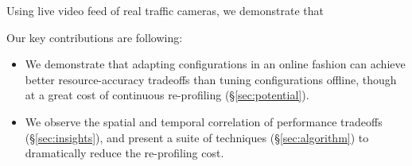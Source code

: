 {Using live video feed of \fillme real traffic cameras, we demonstrate
that 

Our key contributions are following:
\begin{itemize}
    \item We demonstrate that adapting \nn configurations in an online 
    fashion can achieve better resource-accuracy tradeoffs than 
    tuning configurations offline, though at a great cost of continuous 
    re-profiling (\S\ref{sec:potential}).
    \item We observe the spatial and temporal correlation of performance 
    tradeoffs (\S\ref{sec:insights}), and present a suite of techniques 
    (\S\ref{sec:algorithm}) to dramatically reduce the re-profiling cost.
\end{itemize}
}